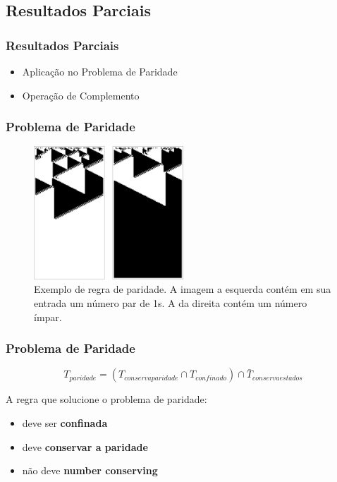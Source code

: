 \documentclass[aspectratio=43,hyperref={pdfpagelabels=false}]{beamer}
\begin{document}
 \subsection*{Resultados Parciais}
 \begin{frame}
     \frametitle{Resultados Parciais}
     \begin{itemize}
           \item Aplicação no Problema de Paridade
           \item Operação de Complemento
     \end{itemize}
 \end{frame}

\begin{frame}
    \frametitle{Problema de Paridade}
    \begin{figure}[h!]
        \centering
        \includegraphics[width=0.5\textwidth]{fig_parityRule.pdf}
        \caption{Exemplo de regra de paridade. A imagem a esquerda contém em sua entrada um número par de 1s. A da direita contém um número ímpar.}
    \end{figure}
\end{frame}

\begin{frame}
    \frametitle{Problema de Paridade}
    \begin{equation}
    T_{paridade} = (T_{conservaparidade} \cap T_{confinado}) \cap \bar{T}_{conservaestados}
    \label{eq:operationsTemplateParidade}
    \end{equation}

    \begin{alertblock}{A regra que solucione o problema de paridade:}
        \vspace{-0.4cm}    
        \begin{itemize}
          \item deve ser \textbf{confinada}
          \item deve \textbf{conservar a paridade}
          \item não deve \textbf{number conserving}
        \end{itemize}
    \end{alertblock}
\end{frame}
\end{document}
